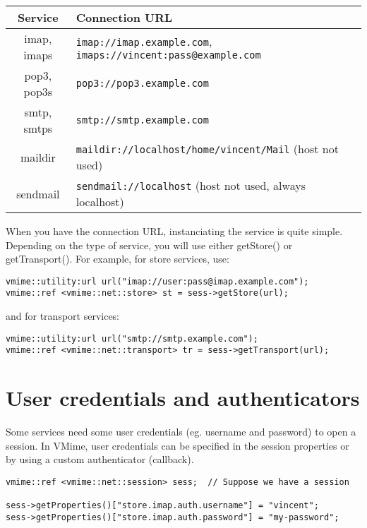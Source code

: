 \noindent\begin{tabularx}{1.0\textwidth}{|c|X|}
\hline
	{\bf Service} &
	{\bf Connection URL} \\
\hline
imap, imaps & {\tt imap://imap.example.com},
{\tt imaps://vincent:pass@example.com} \\
\hline
pop3, pop3s & {\tt pop3://pop3.example.com} \\
\hline
smtp, smtps & {\tt smtp://smtp.example.com} \\
\hline
maildir & {\tt maildir://localhost/home/vincent/Mail} (host not used) \\
\hline
sendmail & {\tt sendmail://localhost} (host not used, always localhost) \\
\hline
\end{tabularx}

\newpage

When you have the connection URL, instanciating the service is quite simple.
Depending on the type of service, you will use either {\vcode getStore()} or
{\vcode getTransport()}. For example, for store services, use:

\begin{lstlisting}
vmime::utility:url url("imap://user:pass@imap.example.com");
vmime::ref <vmime::net::store> st = sess->getStore(url);
\end{lstlisting}

and for transport services:

\begin{lstlisting}
vmime::utility:url url("smtp://smtp.example.com");
vmime::ref <vmime::net::transport> tr = sess->getTransport(url);
\end{lstlisting}


\section{User credentials and authenticators}

Some services need some user credentials (eg. username and password) to open
a session. In VMime, user credentials can be specified in the session
properties or by using a custom authenticator (callback).

\begin{lstlisting}[caption={Setting user credentials using session
properties}]
vmime::ref <vmime::net::session> sess;  // Suppose we have a session

sess->getProperties()["store.imap.auth.username"] = "vincent";
sess->getProperties()["store.imap.auth.password"] = "my-password";
\end{lstlisting}

